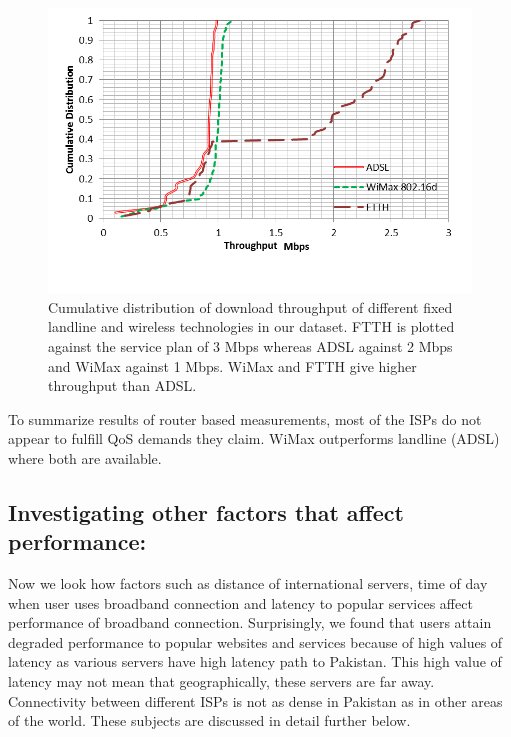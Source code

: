 \documentclass{sig-alternate-10pt}
\begin{document}
\begin{sloppypar}
\begin{figure}[t!]
\begin {center}
   \includegraphics[height=0.2 \textheight,width=0.5 \textwidth]{10.png}
   \end {center}
 \caption{Cumulative distribution of download throughput of different fixed landline and wireless technologies in our dataset. FTTH is plotted against the service plan of 3 Mbps whereas ADSL against 2 Mbps and WiMax against 1 Mbps. WiMax and FTTH give higher throughput than ADSL.} \label{Fig:11}
\end{figure}



\indent To summarize results of router based measurements, most of the ISPs do not appear to fulfill QoS demands they claim. WiMax outperforms landline (ADSL) where both are available.

\subsection {Investigating other factors that affect performance:}
Now we look how factors such as distance of international servers, time of day when user uses broadband connection and latency to popular services affect   performance of broadband connection. Surprisingly, we found that users attain degraded performance to popular websites and services because of high values of latency as various servers have high latency path to Pakistan. This high value of latency may not mean that geographically, these servers are far away. Connectivity between different ISPs is not as dense in Pakistan as in other areas of the world. These subjects are discussed in detail further below.


\end{sloppypar}
\end{document}
